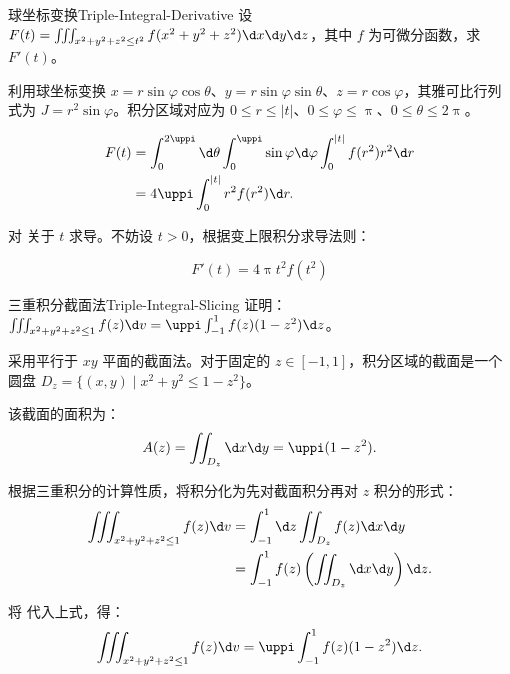 \begin{problem}{球坐标变换}{Triple-Integral-Derivative}
    设 $F(t) = \iiint_{x^2+y^2+z^2 \le t^2} f(x^2+y^2+z^2) \d x \d y \d z$，其中 $f$ 为可微分函数，求 $F'(t)$。
\end{problem}

\begin{solution}
    利用球坐标变换 $x = r \sin \varphi \cos \theta$、$y = r \sin \varphi \sin \theta$、$z = r \cos \varphi$，其雅可比行列式为 $J = r^2 \sin \varphi$。积分区域对应为 $0 \le r \le |t|$、$0 \le \varphi \le \uppi$、$0 \le \theta \le 2\uppi$。

    \begin{equation}
        \begin{aligned}
            F(t) & = \int_0^{2\uppi} \d \theta \int_0^{\uppi} \sin \varphi \d \varphi \int_0^{|t|} f(r^2) r^2 \d r \\
                 & = 4\uppi \int_0^{|t|} r^2 f(r^2) \d r.
        \end{aligned}
        \label{eq:F-integral-form}
    \end{equation}

    对  关于 $t$ 求导。不妨设 $t > 0$，根据变上限积分求导法则：

    \begin{equation}
        \boxed{F'(t) = 4\uppi t^2 f(t^2)}
    \end{equation}
\end{solution}

\begin{problem}{三重积分截面法}{Triple-Integral-Slicing}
    证明：$\iiint_{x^2+y^2+z^2 \le 1} f(z) \d v = \uppi \int_{-1}^1 f(z)(1 - z^2) \d z$。
\end{problem}

\begin{myproof}
    采用平行于 $xy$ 平面的截面法。对于固定的 $z \in [-1, 1]$，积分区域的截面是一个圆盘 $D_z = \{ (x, y) \mid x^2 + y^2 \le 1 - z^2 \}$。

    该截面的面积为：
    \begin{equation}
        A(z) = \iint_{D_z} \d x \d y = \uppi (1 - z^2).
        \label{eq:area-element}
    \end{equation}

    根据三重积分的计算性质，将积分化为先对截面积分再对 $z$ 积分的形式：
    \begin{equation}
        \begin{aligned}
            \iiint_{x^2+y^2+z^2 \le 1} f(z) \d v & = \int_{-1}^1 \d z \iint_{D_z} f(z) \d x \d y                 \\
                                                 & = \int_{-1}^1 f(z) \left( \iint_{D_z} \d x \d y \right) \d z.
        \end{aligned}
    \end{equation}

    将  代入上式，得：
    \begin{equation}
        \iiint_{x^2+y^2+z^2 \le 1} f(z) \d v = \uppi \int_{-1}^1 f(z)(1 - z^2) \d z.
    \end{equation}
\end{myproof}

